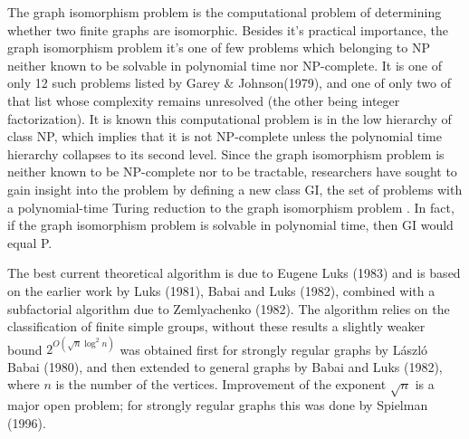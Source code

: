\documentclass[12pt,a4paper]{book}
\theoremstyle{plain}
\theoremstyle{definition}
\theoremstyle{remark}
\begin{document}
The graph isomorphism problem is the computational problem of determining whether two finite graphs are isomorphic. Besides it's 
practical importance, the graph isomorphism problem it's one of few problems which belonging to NP neither known to be solvable 
in polynomial time nor NP-complete. It is one of only 12 such problems listed by Garey $\&$ Johnson(1979), and one of only two 
of that list whose complexity remains unresolved (the other being integer factorization). It is known this computational problem
is in the low hierarchy of class NP, which implies that it is not NP-complete unless 
the polynomial time hierarchy collapses to its second level. Since the graph isomorphism problem is neither known to be NP-complete nor to be tractable, researchers have  sought to gain insight into the problem by defining a new class GI, the set of problems with a polynomial-time Turing 
  reduction to the graph isomorphism problem \cite{Booth77problemspolynomially}. In fact, if the graph isomorphism problem is solvable in polynomial time, 
then  GI would equal P.

  The best current theoretical algorithm is due to Eugene Luks (1983) and is based on the earlier work by Luks (1981), Babai and Luks (1982), combined with a subfactorial algorithm due to Zemlyachenko (1982). The algorithm relies on the  classification of finite simple groups, 
  without these results a slightly weaker bound $2^{O(\sqrt{n}\log^2 n)}$ was obtained 
  first for strongly regular graphs by László Babai (1980), and then extended to general graphs by Babai and Luks (1982), where $n$ is the number of the vertices.
  Improvement of the exponent $\sqrt{n}$ is a major open problem; for strongly regular graphs this was done by Spielman 
  (1996).
\end{document}
